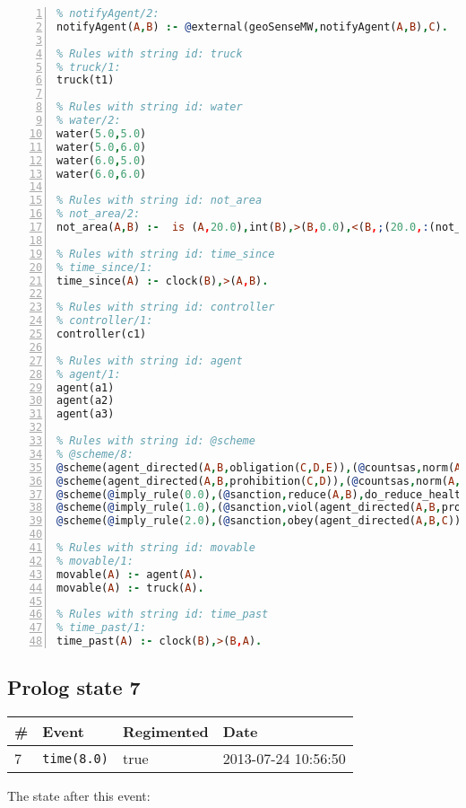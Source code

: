 \documentclass[11pt]{article}\usepackage[utf8]{inputenc}\usepackage{geometry}
\begin{document}
\begin{lstlisting}[language=Prolog, numbers=left]
% Rules with string id: notifyAgent
% notifyAgent/2:
notifyAgent(A,B) :- @external(geoSenseMW,notifyAgent(A,B),C).

% Rules with string id: truck
% truck/1:
truck(t1)

% Rules with string id: water
% water/2:
water(5.0,5.0)
water(5.0,6.0)
water(6.0,5.0)
water(6.0,6.0)

% Rules with string id: not_area
% not_area/2:
not_area(A,B) :-  is (A,20.0),int(B),>(B,0.0),<(B,;(20.0,:(not_area(A,B), is (-(B),20.0)))),int(A),>(A,0.0),<(A,;(20.0,:(area(A,B),-(int(A))))),int(B),>(A,0.0),>(B,0.0),<(A,21.0),<(B,21.0).

% Rules with string id: time_since
% time_since/1:
time_since(A) :- clock(B),>(A,B).

% Rules with string id: controller
% controller/1:
controller(c1)

% Rules with string id: agent
% agent/1:
agent(a1)
agent(a2)
agent(a3)

% Rules with string id: @scheme
% @scheme/8:
@scheme(agent_directed(A,B,obligation(C,D,E)),(@countsas,norm(A,B,F,obligation(C,D,E)),F),false,(listTrue(C)),(time_past(D)),false,[plus(viol(agent_directed(A,B,obligation(C,D,E))))|[]],[plus(obey(agent_directed(A,B,obligation(C,D,E))))|[]])
@scheme(agent_directed(A,B,prohibition(C,D)),(@countsas,norm(A,B,E,prohibition(C,D)),E),(listTrue(C)),false,(false),false,[plus(viol(agent_directed(A,B,prohibition(C,D))))|[]],[plus(obey(agent_directed(A,B,prohibition(C,D))))|[]])
@scheme(@imply_rule(0.0),(@sanction,reduce(A,B),do_reduce_health(A,B),notifyAgent(A,changed(status))),true,false,false,false,[min(reduce(A,B))|[]],[])
@scheme(@imply_rule(1.0),(@sanction,viol(agent_directed(A,B,prohibition(C,D))),do_sanction(D)),true,false,false,false,[min(viol(agent_directed(A,B,prohibition(C,D))))|[]],[])
@scheme(@imply_rule(2.0),(@sanction,obey(agent_directed(A,B,C))),true,false,false,false,[min(obey(agent_directed(A,B,C)))|[]],[])

% Rules with string id: movable
% movable/1:
movable(A) :- agent(A).
movable(A) :- truck(A).

% Rules with string id: time_past
% time_past/1:
time_past(A) :- clock(B),>(B,A).

\end{lstlisting}
\clearpage 
\subsection{Prolog state 7}
\begin{table}[ht]
\centering 
\begin{tabular}{l l l l} 
\textbf{\#} & \textbf{Event} & \textbf{Regimented} & \textbf{Date} \\ [0.5ex] 
\hline
7&\texttt{time(8.0)}&true&2013-07-24 10:56:50\\ [1ex] \hline\end{tabular}
\end{table}
The state after this event:
\end{document}
